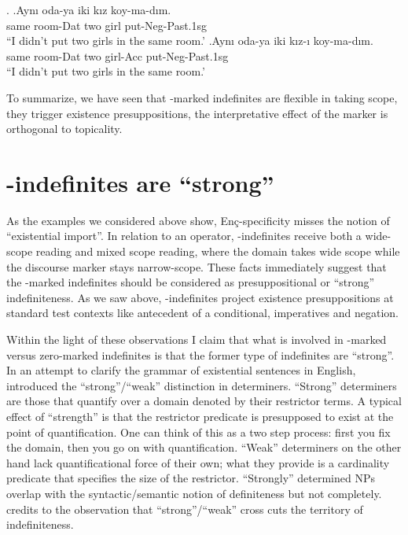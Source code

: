 \documentclass[11pt,a4paper]{article}
\newcommand{\encspec}{Enç-specific}
\begin{document}
\ex.
\ag.\label{odaz}Aynı oda-ya iki kız koy-ma-dım.\\
same room-Dat  two girl put-Neg-Past.1sg\\
``I didn't put two girls in the same room.'
\bg.\label{odaa}Aynı oda-ya iki kız-ı koy-ma-dım.\\
same room-Dat  two girl-Acc put-Neg-Past.1sg\\
``I didn't put two girls in the same room.'



To summarize, we have seen that \acc-marked indefinites are flexible in taking scope, they trigger existence presuppositions, the interpretative effect of the marker is orthogonal to topicality.


\section{\acc-indefinites are ``strong''}
\label{scstrong}

As the examples we considered above show, \encspec ity misses the notion of
``existential import''.  In relation to an operator, \acc-indefinites receive
both a wide-scope reading and mixed scope reading, where the domain takes wide
scope while the discourse marker stays narrow-scope.  These facts immediately
suggest that the \acc-marked indefinites should be considered as
presuppositional or ``strong'' indefiniteness.  As we saw above,
\acc-indefinites project existence presuppositions at standard test contexts
like antecedent of a conditional, imperatives and negation. 

Within the light of these observations I claim that what is involved in
\acc-marked versus zero-marked indefinites is that the former type of
indefinites are ``strong''.  In an attempt to clarify the grammar of
existential sentences in English, \cite{milsark77} introduced the
``strong''/``weak'' distinction in determiners. ``Strong'' determiners are
those that quantify over a domain denoted by their restrictor terms. A typical
effect of ``strength'' is that the restrictor predicate is presupposed to exist
at the point of quantification. One can think of this as a two step process:
first you fix the domain, then you go on with quantification. ``Weak''
determiners on the other hand lack quantificational force of their own; what
they provide is a cardinality predicate that specifies the size of the
restrictor. ``Strongly'' determined NPs overlap with the syntactic/semantic
notion of definiteness but not completely.  credits to
 the observation that ``strong''/``weak'' cross cuts the
territory of indefiniteness. 
\end{document}
